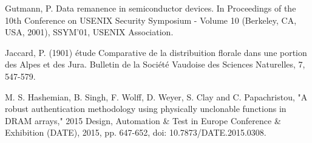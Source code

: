 \documentclass[journal, a4paper]{IEEEtran}
\begin{document}
\begin{thebibliography}{1}
    Gutmann, P. Data remanence in semiconductor devices. In Proceedings of the 10th Conference on USENIX Security Symposium - Volume 10 (Berkeley, CA, USA, 2001), SSYM’01, USENIX Association.

    Jaccard, P. (1901) étude Comparative de la distribuition florale dans une portion des Alpes et des Jura. Bulletin de la Société Vaudoise des Sciences Naturelles, 7, 547-579.

    M. S. Hashemian, B. Singh, F. Wolff, D. Weyer, S. Clay and C. Papachristou, "A robust authentication methodology using physically unclonable functions in DRAM arrays," 2015 Design, Automation \& Test in Europe Conference \& Exhibition (DATE), 2015, pp. 647-652, doi: 10.7873/DATE.2015.0308.

\end{thebibliography}

\end{document}
